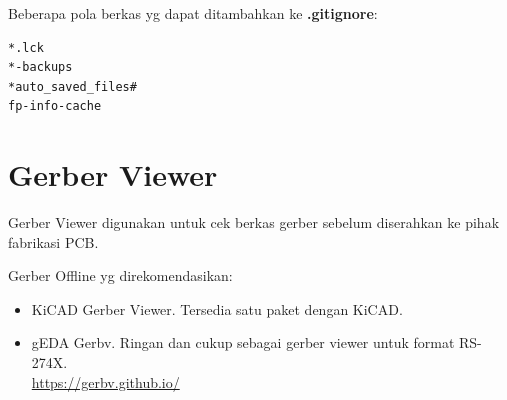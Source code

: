 \documentclass[12pt]{book}
\begin{document}
	Beberapa pola berkas yg dapat ditambahkan ke \textbf{.gitignore}:
	
	\begin{verbatim}
*.lck
*-backups
*auto_saved_files#
fp-info-cache
	\end{verbatim}
	
	\newpage
	\section{Gerber Viewer}
	
	Gerber Viewer digunakan untuk cek berkas gerber sebelum diserahkan ke pihak fabrikasi PCB.
	
	Gerber Offline yg direkomendasikan:
	\begin{itemize}
		\item KiCAD Gerber Viewer. Tersedia satu paket dengan KiCAD.
		\item gEDA Gerbv. Ringan dan cukup sebagai gerber viewer untuk format RS-274X.\\
		\url{https://gerbv.github.io/}
	\end{itemize}
	
\end{document}
